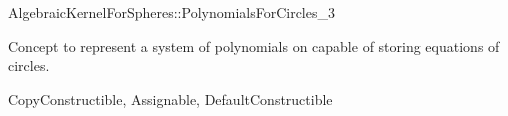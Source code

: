 \begin{ccRefConcept}{AlgebraicKernelForSpheres::PolynomialsForCircles_3}

\ccDefinition

Concept to represent a system of polynomials on 
capable of storing equations of circles. 

\ccRefines
CopyConstructible, Assignable, DefaultConstructible






\ccSeeAlso


\end{ccRefConcept}

